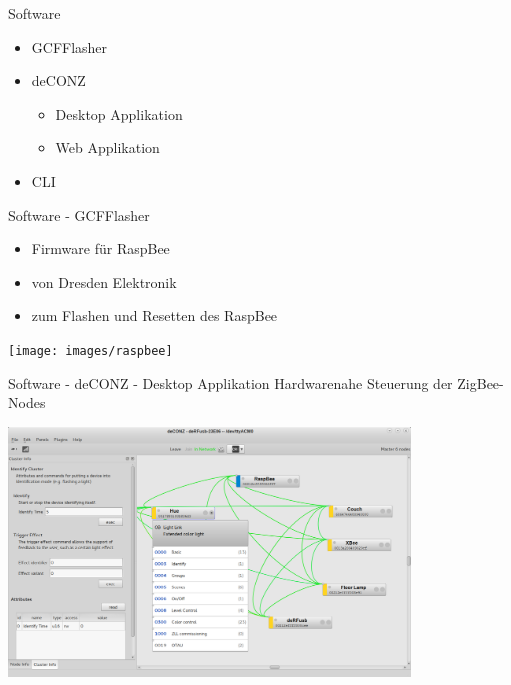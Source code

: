 \begin{frame}{Software}
  \Large
  \begin{itemize}
	\item GCFFlasher
	\item deCONZ
    \begin{itemize}
      \Large
      \item Desktop Applikation
      \item Web Applikation
    \end{itemize}
	\item CLI
  \end{itemize}
\end{frame}

\begin{frame}{Software - GCFFlasher}
  \Large
  \begin{itemize}
	\item Firmware für RaspBee
	\item von Dresden Elektronik
	\item zum Flashen und Resetten des RaspBee
  \end{itemize}

  \begin{center}
    \texttt{[image: images/raspbee]}
  \end{center}
\end{frame}

\begin{frame}{Software - deCONZ - Desktop Applikation}
  \Large
  Hardwarenahe Steuerung der ZigBee-Nodes

  \begin{center}
    \includegraphics[width=0.8\textwidth]{images/deconz_app}
  \end{center}
\end{frame}

